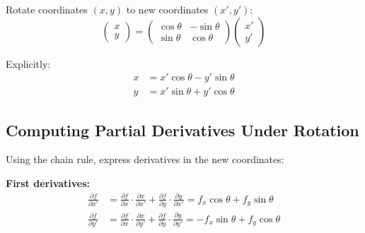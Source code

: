 \documentclass[12pt,a4paper]{article}
\begin{document}
\begin{conceptbox}
Rotate coordinates $(x,y)$ to new coordinates $(x', y')$:
\[
\begin{pmatrix} x \\ y \end{pmatrix} =
\begin{pmatrix} \cos\theta & -\sin\theta \\ \sin\theta & \cos\theta \end{pmatrix}
\begin{pmatrix} x' \\ y' \end{pmatrix}
\]

Explicitly:
\begin{align*}
x &= x'\cos\theta - y'\sin\theta \\
y &= x'\sin\theta + y'\cos\theta
\end{align*}
\end{conceptbox}

\begin{center}
\end{center}

\subsection{Computing Partial Derivatives Under Rotation}

Using the chain rule, express derivatives in the new coordinates:

\textbf{First derivatives:}
\begin{align*}
\frac{\partial f}{\partial x'} &= \frac{\partial f}{\partial x} \cdot \frac{\partial x}{\partial x'} + \frac{\partial f}{\partial y} \cdot \frac{\partial y}{\partial x'} = f_x \cos\theta + f_y \sin\theta \\[0.5em]
\frac{\partial f}{\partial y'} &= \frac{\partial f}{\partial x} \cdot \frac{\partial x}{\partial y'} + \frac{\partial f}{\partial y} \cdot \frac{\partial y}{\partial y'} = -f_x \sin\theta + f_y \cos\theta
\end{align*}
\end{document}

